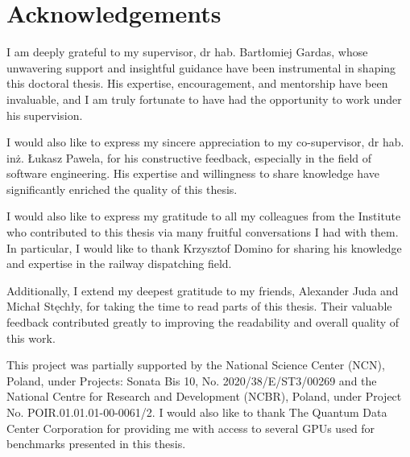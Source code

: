 \chapter{Acknowledgements}

I am deeply grateful to my supervisor, dr hab. Bartłomiej Gardas, whose unwavering support and insightful guidance have been instrumental in shaping this doctoral thesis. His expertise, encouragement, and mentorship have been invaluable, and I am truly fortunate to have had the opportunity to work under his supervision.

I would also like to express my sincere appreciation to my co-supervisor, dr hab. inż. Łukasz Pawela, for his constructive feedback, especially in the field of software engineering. His expertise and willingness to share knowledge have significantly enriched the quality of this thesis.

I would also like to express my gratitude to all my colleagues from the Institute who contributed to this thesis via many fruitful conversations I had with them. In particular, I would like to thank Krzysztof Domino for sharing his knowledge and expertise in the railway dispatching field.

Additionally, I extend my deepest gratitude to my friends, Alexander Juda and Michał Stęchły, for taking the time to read parts of this thesis. Their valuable feedback contributed greatly to improving the readability and overall quality of this work.

This project was partially supported by the National Science Center (NCN), Poland, under Projects: Sonata Bis 10, No. 2020/38/E/ST3/00269
and the National Centre for Research and Development (NCBR), Poland, under Project No. POIR.01.01.01-00-0061/2. I would also like to thank The Quantum Data Center Corporation for providing me with access to several GPUs used for benchmarks presented in this thesis.

